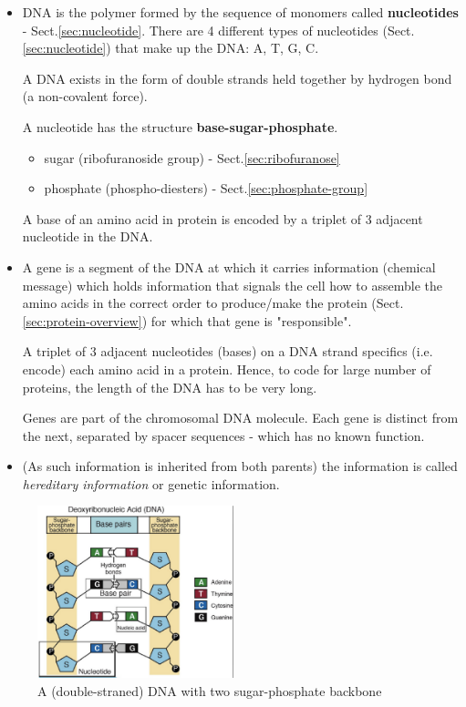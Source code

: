 \begin{itemize}

 \item DNA is the polymer formed by the sequence of monomers called {\bf
  nucleotides} - Sect.\ref{sec:nucleotide}. There are 4 different types of
  nucleotides (Sect.\ref{sec:nucleotide}) that make up the DNA: A, T, G, C.

A DNA exists in the form of double strands held together by hydrogen bond (a
non-covalent force). 

A nucleotide has the structure {\bf base-sugar-phosphate}. 
\begin{itemize}
  \item sugar (ribofuranoside group) - Sect.\ref{sec:ribofuranose}
  \item phosphate (phospho-diesters) - Sect.\ref{sec:phosphate-group}
\end{itemize}
A base of an amino acid in protein is encoded by a triplet of 3 adjacent
nucleotide in the DNA.

  \item  A gene is a segment of the DNA at which it carries information
  (chemical message) which holds information that signals the cell how to
  assemble the amino acids in the correct order to produce/make the protein
  (Sect.\ref{sec:protein-overview}) for which that gene is "responsible".

A triplet of 3 adjacent nucleotides (bases) on a DNA strand specifics (i.e.
encode) each amino acid in a protein. Hence, to code for large number of
proteins, the length of the DNA has to be very long.  

Genes are part of the chromosomal DNA molecule. Each gene is distinct from the
next, separated by spacer sequences  -  which has no known function.

  \item (As such information is inherited from both parents) the
  information is called {\it hereditary information} or genetic information.

 \end{itemize}

\begin{figure}[hbt]
  \centerline{\includegraphics[height=5cm,
    angle=0]{./images/DNA.eps}}
\caption{A (double-straned) DNA with two sugar-phosphate backbone}
\label{fig:DNA}
\end{figure}


